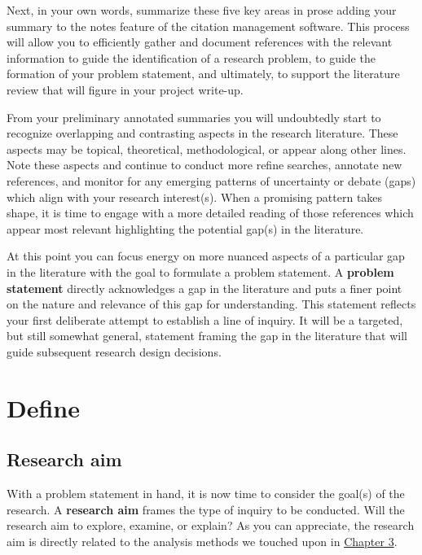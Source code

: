 \documentclass[
  letterpaper,
  DIV=11,
  numbers=noendperiod]{scrreprt}
\theoremstyle{definition}
\theoremstyle{remark}
\begin{document}
Next, in your own words, summarize these five key areas in prose adding
your summary to the notes feature of the citation management software.
This process will allow you to efficiently gather and document
references with the relevant information to guide the identification of
a research problem, to guide the formation of your problem statement,
and ultimately, to support the literature review that will figure in
your project write-up.

From your preliminary annotated summaries you will undoubtedly start to
recognize overlapping and contrasting aspects in the research
literature. These aspects may be topical, theoretical, methodological,
or appear along other lines. Note these aspects and continue to conduct
more refine searches, annotate new references, and monitor for any
emerging patterns of uncertainty or debate (gaps) which align with your
research interest(s). When a promising pattern takes shape, it is time
to engage with a more detailed reading of those references which appear
most relevant highlighting the potential gap(s) in the literature.

At this point you can focus energy on more nuanced aspects of a
particular gap in the literature with the goal to formulate a problem
statement. A \textbf{problem statement} directly acknowledges a gap in
the literature and puts a finer point on the nature and relevance of
this gap for understanding. This statement reflects your first
deliberate attempt to establish a line of inquiry. It will be a
targeted, but still somewhat general, statement framing the gap in the
literature that will guide subsequent research design decisions.

\section{Define}\label{sec-fr-define}

\subsection{Research aim}\label{sec-fr-aim}

With a problem statement in hand, it is now time to consider the goal(s)
of the research. A \textbf{research aim} frames the type of inquiry to
be conducted. Will the research aim to explore, examine, or explain? As
you can appreciate, the research aim is directly related to the analysis
methods we touched upon in \hyperref[sec-approaching-analysis]{Chapter
3}.
\end{document}
